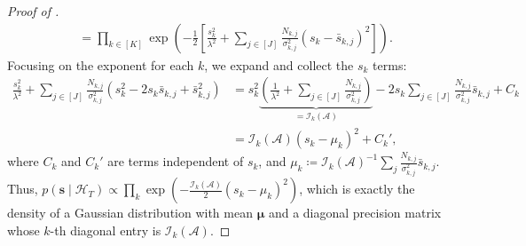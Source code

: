 \documentclass{article}
\def\vs{{\bm{s}}}
\def\gA{{\mathcal{A}}}
\def\gH{{\mathcal{H}}}
\def\gI{{\mathcal{I}}}
\theoremstyle{plain}
\theoremstyle{definition}
\theoremstyle{plain}
\begin{document}
\begin{proof}[Proof of ]
\begin{align}
        &= \prod_{k \in [K]} \exp \left( - \frac{1}{2} \left[ \frac{s_k^2}{\lambda^2} + \sum_{j \in [J]} \frac{N_{k,j}}{\sigma_{k,j}^2} (s_k - \bar{s}_{k,j})^2 \right] \right).
    \end{align}
    Focusing on the exponent for each $k$, we expand and collect the $s_k$ terms:
    \begin{align}
        \frac{s_k^2}{\lambda^2} + \sum_{j \in [J]} \frac{N_{k,j}}{\sigma_{k,j}^2} (s_k^2 - 2 s_k \bar{s}_{k,j} + \bar{s}_{k,j}^2)
        &= s_k^2 \underbrace{\left( \frac{1}{\lambda^2} + \sum_{j \in [J]} \frac{N_{k,j}}{\sigma_{k,j}^2} \right)}_{= \gI_k(\gA)} - 2s_k \sum_{j \in [J]} \frac{N_{k,j}}{\sigma_{k,j}^2} \bar{s}_{k,j} + C_k \\
        &= \gI_k(\gA) (s_k - \mu_k)^2 + C_k',
    \end{align}
    where $C_k$ and $C_k'$ are terms independent of $s_k$, and $\mu_k \coloneq \gI_k(\gA)^{-1} \sum_j \frac{N_{k,j}}{\sigma_{k,j}^2} \bar{s}_{k,j}$.
    Thus, $p(\vs \mid \gH_T) \propto \prod_k \exp\left( - \frac{\gI_k(\gA)}{2} (s_k - \mu_k)^2 \right)$, which is exactly the density of a Gaussian distribution with mean $\boldsymbol{\mu}$ and a diagonal precision matrix whose $k$-th diagonal entry is $\gI_k(\gA)$.
\end{proof}
\end{document}
